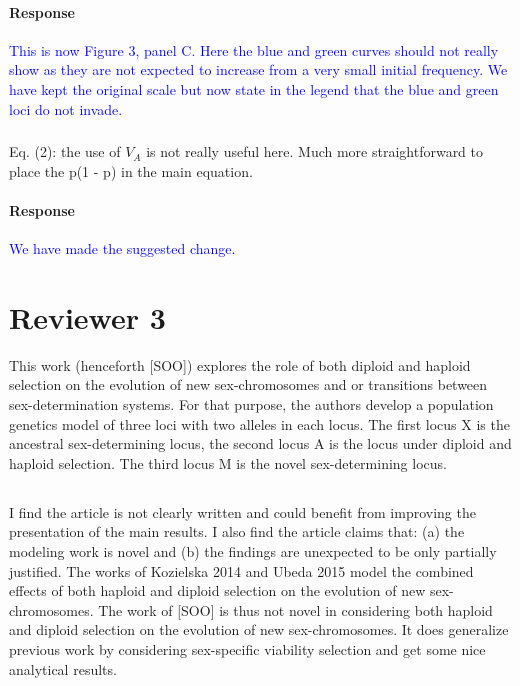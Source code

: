 \documentclass[10pt,letterpaper]{article}
\begin{document}
\noindent\paragraph{Response}
\textcolor{blue}{This is now Figure 3, panel C. Here the blue and green curves should not really show as they are not expected to increase from a very small initial frequency. We have kept the original scale but now state in the legend that the blue and green loci do not invade.}

\noindent\subsubsection{}
Eq. (2): the use of $V_A$ is not really useful here. Much more straightforward to place the p(1 - p) in the main equation.

\noindent\paragraph{Response}
\textcolor{blue}{We have made the suggested change.}

\section{Reviewer 3}

This work (henceforth [SOO]) explores the role of both diploid and haploid selection on the evolution of new sex-chromosomes and or transitions between sex-determination systems. For that purpose, the authors develop a population genetics model of three loci with two alleles in each locus. The first locus X is the ancestral sex-determining locus, the second locus A is the locus under diploid and haploid selection. The third locus M is the novel sex-determining locus.

\noindent\subsection{}
I find the article is not clearly written and could benefit from improving the presentation of the main results. 
I also find the article claims that: (a) the modeling work is novel and (b) the findings are unexpected to be only partially justified.
The works of Kozielska 2014 and Ubeda 2015 model the combined effects of both haploid and diploid selection on the evolution of new sex-chromosomes. The work of [SOO] is thus not novel in considering both haploid and diploid selection on the evolution of new sex-chromosomes. It does generalize previous work by considering sex-specific viability selection and get some nice analytical results.
\end{document}
